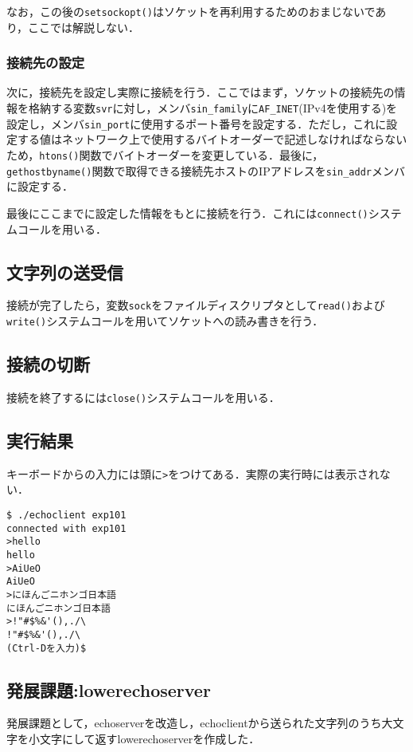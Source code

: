 \documentclass[a4j,10pt,titlepage]{jsarticle}
\begin{document}
なお，この後の\verb|setsockopt()|はソケットを再利用するためのおまじないであり，ここでは解説しない．

\subsubsection{接続先の設定}
次に，接続先を設定し実際に接続を行う．ここではまず，ソケットの接続先の情報を格納する変数\verb|svr|に対し，メンバ\verb|sin_family|に\verb|AF_INET|(IPv4を使用する)を設定し，メンバ\verb|sin_port|に使用するポート番号を設定する．ただし，これに設定する値はネットワーク上で使用するバイトオーダーで記述しなければならないため，\verb|htons()|関数でバイトオーダーを変更している．最後に，\verb|gethostbyname()|関数で取得できる接続先ホストのIPアドレスを\verb|sin_addr|メンバに設定する．

最後にここまでに設定した情報をもとに接続を行う．これには\verb|connect()|システムコールを用いる．

\subsection{文字列の送受信}
接続が完了したら，変数\verb|sock|をファイルディスクリプタとして\verb|read()|および\verb|write()|システムコールを用いてソケットへの読み書きを行う．

\subsection{接続の切断}
接続を終了するには\verb|close()|システムコールを用いる．

\subsection{実行結果}
キーボードからの入力には頭に\verb|>|をつけてある．実際の実行時には表示されない．

\begin{verbatim}
$ ./echoclient exp101
connected with exp101
>hello
hello
>AiUeO
AiUeO
>にほんごニホンゴ日本語
にほんごニホンゴ日本語
>!"#$%&'(),./\
!"#$%&'(),./\
(Ctrl-Dを入力)$
\end{verbatim}

\subsection{発展課題:lowerechoserver}
発展課題として，echoserverを改造し，echoclientから送られた文字列のうち大文字を小文字にして返すlowerechoserverを作成した．
\end{document}
